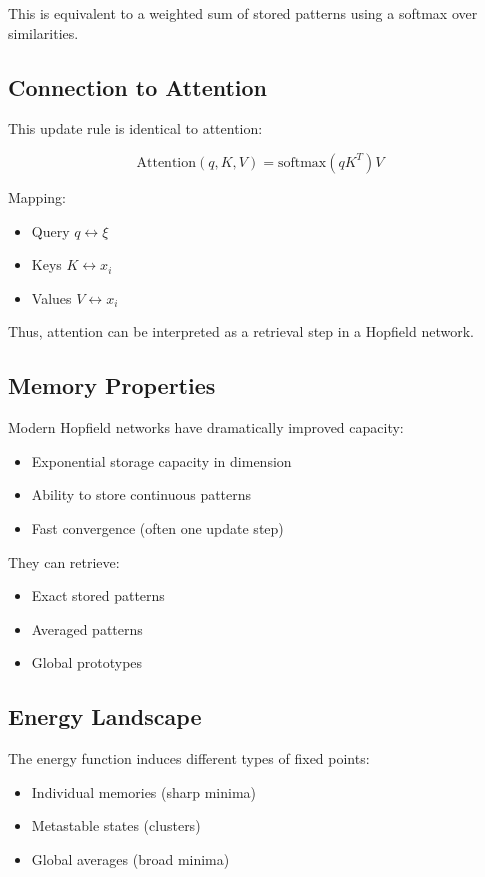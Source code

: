 \documentclass[12pt]{article}
\begin{document}
This is equivalent to a weighted sum of stored patterns using a softmax over similarities.

\subsection{Connection to Attention}

This update rule is identical to attention:

\[
		\text{Attention}(q, K, V) = \text{softmax}(q K^T) V
\]

Mapping:
\begin{itemize}
		\item Query $q \leftrightarrow \xi$
		\item Keys $K \leftrightarrow x_i$
		\item Values $V \leftrightarrow x_i$
\end{itemize}

Thus, attention can be interpreted as a retrieval step in a Hopfield network.

\subsection{Memory Properties}

Modern Hopfield networks have dramatically improved capacity:

\begin{itemize}
		\item Exponential storage capacity in dimension
		\item Ability to store continuous patterns
		\item Fast convergence (often one update step)
\end{itemize}

They can retrieve:
\begin{itemize}
		\item Exact stored patterns
		\item Averaged patterns
		\item Global prototypes
\end{itemize}

\subsection{Energy Landscape}

The energy function induces different types of fixed points:

\begin{itemize}
		\item Individual memories (sharp minima)
		\item Metastable states (clusters)
		\item Global averages (broad minima)
\end{itemize}
\end{document}

